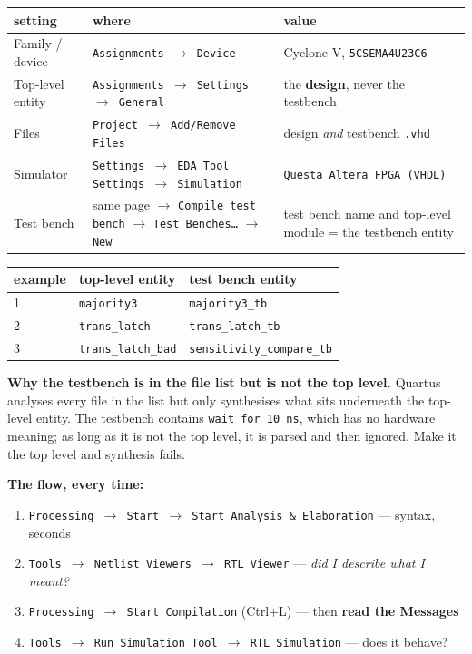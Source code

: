 \documentclass[11pt]{article}
\newcommand{\code}[1]{\texttt{#1}}
\begin{document}
\begin{center}
\small
\begin{tabular}{>{\raggedright\arraybackslash}p{2.4cm}>{\raggedright\arraybackslash}p{7.2cm}>{\raggedright\arraybackslash}p{5.6cm}}
\toprule
setting & where & value \\
\midrule
Family / device & \code{Assignments $\rightarrow$ Device} & Cyclone V, \code{5CSEMA4U23C6} \\
Top-level entity & \code{Assignments $\rightarrow$ Settings $\rightarrow$ General} & the \textbf{design}, never the testbench \\
Files & \code{Project $\rightarrow$ Add/Remove Files} & design \emph{and} testbench \code{.vhd} \\
Simulator & \code{Settings $\rightarrow$ EDA Tool Settings $\rightarrow$ Simulation} & \code{Questa Altera FPGA (VHDL)} \\
Test bench & same page $\rightarrow$ \code{Compile test bench} $\rightarrow$ \code{Test Benches\ldots} $\rightarrow$ \code{New} & test bench name and top-level module = the testbench entity \\
\bottomrule
\end{tabular}
\normalsize
\end{center}

\begin{center}
\begin{tabular}{lll}
\toprule
example & top-level entity & test bench entity \\
\midrule
1 & \code{majority3} & \code{majority3\_tb} \\
2 & \code{trans\_latch} & \code{trans\_latch\_tb} \\
3 & \code{trans\_latch\_bad} & \code{sensitivity\_compare\_tb} \\
\bottomrule
\end{tabular}
\end{center}

\textbf{Why the testbench is in the file list but is not the top level.} Quartus
analyses every file in the list but only synthesises what sits underneath the
top-level entity. The testbench contains \code{wait for 10 ns}, which has no hardware
meaning; as long as it is not the top level, it is parsed and then ignored. Make it
the top level and synthesis fails.

\textbf{The flow, every time:}
\begin{enumerate}[leftmargin=2em,itemsep=1pt]
\item \code{Processing $\rightarrow$ Start $\rightarrow$ Start Analysis \& Elaboration} --- syntax, seconds
\item \code{Tools $\rightarrow$ Netlist Viewers $\rightarrow$ RTL Viewer} --- \emph{did I describe what I meant?}
\item \code{Processing $\rightarrow$ Start Compilation} (Ctrl+L) --- then \textbf{read the Messages}
\item \code{Tools $\rightarrow$ Run Simulation Tool $\rightarrow$ RTL Simulation} --- does it behave?
\end{enumerate}
\end{document}
